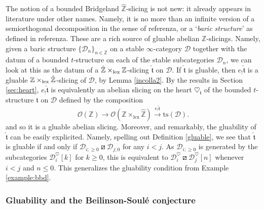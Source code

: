 \documentclass{article}
\theoremstyle{definition}
\newcommand{\Z}{\mathbb{Z}}
\newcommand{\Oo}{\mathcal{O}}
\newcommand{\ts}{\mathrm{ts}}
\newcommand{\tee}{\mathfrak{t}}
\newcommand{\orth}{\boxslash}
\newcommand{\lex}{\times_{\textnormal{lex}}}
\begin{document}
  The notion of a bounded Bridgeland $\hat{\Z}$-slicing is not new: it already appears in literature under other names. Namely, it is no more than an infinite version of a semiorthogonal decomposition in the sense of {\color{red} referenza}, or a `\textit{baric structure}' as defined in {\color{red} referenza}. These are a rich source of gluable abelian $\Z$-slicings. Namely, given a baric structure $\{\mathscr{D}_{n}\}_{n\in \mathbb{Z}}$ on a stable $\infty$-category $\mathscr{D}$ together with the datum of a bounded $t$-structure on each of the stable subcategories $\mathscr{D}_{n}$, we can look at this as the datum of a $\hat{\Z} \lex \Z$-slicing $\hat{\tee}$ on $\mathscr{D}$. If $\hat{\tee}$ is gluable, then $e_!\hat{\tee}$ is a gluable ${\Z} \lex \hat{\Z}$-slicing of $\mathscr{D}$, by Lemma \ref{incolla2}. By the results in Section \ref{sec:heart}, $e_!\hat{\tee}$ is equivalently an abelian slicing on the heart $\heartsuit_{{\tee}}$ of the bounded $t$-structure ${\tee}$ on $\mathscr{D}$ defined by the composition
  \[
 \Oo(\Z)\to \Oo(\Z\times_{\mathrm{lex}}\hat{\Z})\xrightarrow{e_!\hat{\tee}} \ts(\mathscr{D}).
  \]
 and so it is a gluable abelian slicing. {\color{red}Moreover, and remarkably, the gluability of $\hat{\tee}$ can be easily explicited. Namely, spelling out Definition \ref{gluable}, we see that $\hat{\tee}$ is gluable if and only if  $\mathscr{D}_{i;\geq 0}\orth \mathscr{D}_{j;0}$ for any $i<j$. {\color{red}As  $\mathscr{D}_{i;\geq 0}$ is generated by the subcategories $\mathscr{D}_{i}^\heartsuit[k]$ for $k\geq 0$, this is equivalent to $\mathscr{D}_{i}^\heartsuit\orth\mathscr{D}_{j}^\heartsuit[n]$ whenever $i<j$ and $n\leq 0$. This generalizes the gluability condition from Example \ref{example:bbd}.} 
 }

\subsubsection{Gluability and the Beilinson-Soul\'e conjecture}\label{motives}
\end{document}
